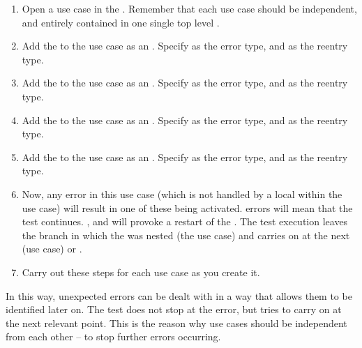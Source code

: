 \begin{enumerate}
\item Open a use case in the \gdtestcaseeditor{}. Remember that each use case should be independent, and entirely contained in one single top level \gdcase{} . 
\item Add the  \gdcase{} to the use case as an \gdehandler{}. Specify  as the error type, and  as the reentry type. 
\item Add the  \gdcase{} to the use case as an \gdehandler{}. Specify  as the error type, and  as the reentry type. 
\item Add the  \gdcase{} to the use case as an \gdehandler{}. Specify  as the error type, and  as the reentry type. 
\item Add the  \gdcase{} to the use case as an \gdehandler{}. Specify  as the error type, and  as the reentry type. 
\item Now, any error in this use case (which is not handled by a local \gdehandler{} within the use case) will result in one of these \gdehandlers{} being activated.  errors will mean that the test continues.  ,  and  will provoke a restart of the \gdaut{}. The test execution leaves the branch in which the \gdehandler{} was nested (the use case) and carries on at the next \gdcase{} (use case) or \gdsuite{}. 
\item Carry out these steps for each use case as you create it. 
\end{enumerate}


In this way, unexpected errors can be dealt with in a way that allows them to be identified later on. The test does not stop at the error, but tries to carry on at the next relevant point. This is the reason why use cases should be independent from each other -- to stop further errors occurring. 
